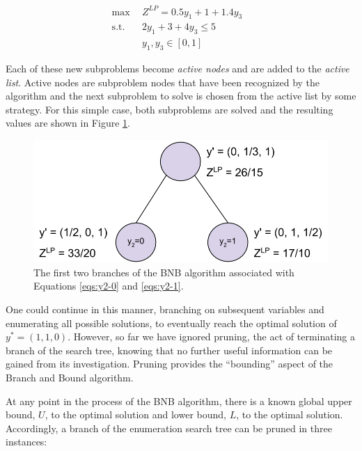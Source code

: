 \begin{subequations}\label{eqs:y2-1}
  \begin{align}
    \max \:\: & 
    Z^{LP} = 0.5 y_1 + 1 + 1.4 y_3
    & \\
    \text{s.t.} \:\: &
    2 y_1 + 3 + 4 y_3 \leq 5 
    & \\
    &
    y_1, y_3 \in [0, 1]
  \end{align}
\end{subequations}

Each of these new subproblems become \textit{active nodes} and are added to
the \textit{active list}. Active nodes are subproblem nodes that have been
recognized by the algorithm and the next subproblem to solve is chosen from the
active list by some strategy. For this simple case, both subproblems are solved
and the resulting values are shown in Figure \ref{fig:branch}.

\begin{figure}[H]
  \begin{center}
    \includegraphics[width=\linewidth]{./chapters/litreview/branch.png}
  \caption{The first two branches of the BNB algorithm associated with 
  Equations \ref{eqs:y2-0} and \ref{eqs:y2-1}.}
  \label{fig:branch}
  \end{center}
\end{figure}

One could continue in this manner, branching on subsequent variables and
enumerating all possible solutions, to eventually reach the optimal solution of
$y^* = (1, 1, 0)$. However, so far we have ignored pruning, the act of
terminating a branch of the search tree, knowing that no further useful
information can be gained from its investigation. Pruning provides the
``bounding'' aspect of the Branch and Bound algorithm.

At any point in the process of the BNB algorithm, there is a known global upper
bound, $U$, to the optimal solution and lower bound, $L$, to the optimal
solution. Accordingly, a branch of the enumeration search tree can be pruned in
three instances:


